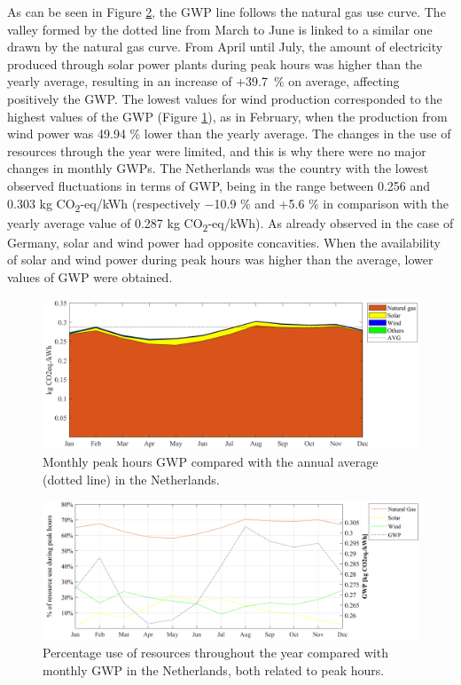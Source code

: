 {{ As can be seen in Figure \ref{COMP_NL}, the GWP line follows the natural gas use curve. The valley formed by the dotted line from March to June is linked to a similar one drawn by the natural gas curve. From April until July, the amount of electricity produced through solar power plants during peak hours was higher than the yearly average, resulting in an increase of {+39.7~\% on average}, affecting positively the GWP. The lowest values for wind production corresponded to the highest values of the GWP (Figure \ref{GWP_NL}), {as in February, when the production from wind power was 49.94 \% lower than the yearly average}. The changes in the use of  resources through the year were limited, and this is why there were no major changes in monthly GWPs. {The Netherlands was the country with the lowest observed fluctuations in terms of GWP, being in the range between 0.256 and 0.303 kg CO\textsubscript2-eq/kWh (respectively $-$10.9 \% and +5.6 \% in comparison with the yearly average value of 0.287 kg CO\textsubscript2-eq/kWh). As already observed in the case of Germany, solar and wind power had opposite concavities. When the availability of solar and wind power during peak hours was higher than the average, lower values of GWP were obtained.} 
 

\begin{figure}[htbp]
	\centering
	\includegraphics[width=1\textwidth]{ChapterLCA/Images/GWP_plots/Netherlands_GWP.png}
	\caption{Monthly peak hours GWP compared with the annual average (dotted line) in the Netherlands.}
	\label{GWP_NL}
\end{figure}
	
\begin{figure}[htbp]
	\centering
	\includegraphics[width=1\textwidth]{ChapterLCA/Images/GWP_plots/Comp_GWP_NL.png}
	\caption{Percentage use of resources throughout the year compared with monthly GWP in the Netherlands, both related to peak hours.}
	\label{COMP_NL}
\end{figure}


}}
